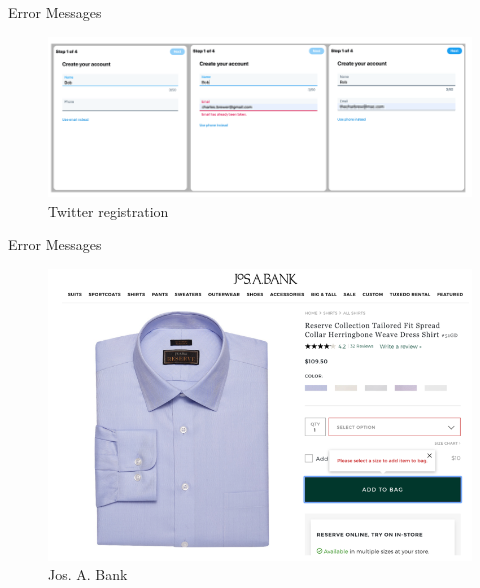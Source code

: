 \documentclass{beamer}
\begin{document}
\begin{frame}[t]{Error Messages}
	\begin{figure}[h]
		\centering
		\includegraphics[scale=0.5]{images/lec08-pic65.png}
		\caption{Twitter registration}
	\end{figure}
\end{frame}

\begin{frame}[t]{Error Messages}
	\begin{figure}[h]
		\centering
		\includegraphics[scale=0.4]{images/lec08-pic66.png}
		\caption{Jos. A. Bank}
	\end{figure}
\end{frame}
\end{document}
